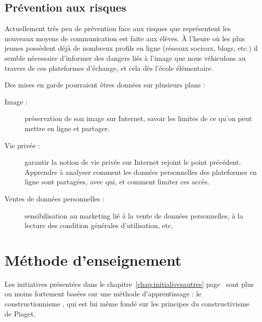 \subsection{Prévention aux risques}
Actuellement très peu de prévention face aux risques que représentent
les nouveaux moyens de communication est faite aux élèves. À
l'heure où les plus jeunes possèdent déjà de nombreux profils en
ligne (réseaux sociaux, blogs, etc.) il semble nécessaire d'informer
des dangers liés à l'image que nous véhiculons au travers de ces
plateformes d'échange, et cela dès l'école élémentaire.

Des mises en garde pourraient êtres données sur plusieurs plans :

\begin{description}
  \item[Image :] préservation de son image sur Internet, savoir les limites de ce qu'on peut mettre en ligne et partager.
  \item[Vie privée :] garantir la notion de vie privée sur Internet rejoint le point précédent. Apprendre à analyser comment les données personnelles des plateformes en ligne sont partagées, avec qui, et comment limiter ces accès.
  \item[Ventes de données personnelles :] sensibilisation au marketing lié à la vente de données personnelles, à la lecture des condition générales d'utilisation, etc.
\end{description}

\section{Méthode d'enseignement}

Les initiatives présentées dans le chapitre~\ref{chap:initialivesautres} page~\pageref{chap:initialivesautres} sont plus ou moins fortement basées sur une méthode d'apprentissage : le \og constructionnisme \fg{}, qui est lui même fondé sur les principes du constructivisme de Piaget.

